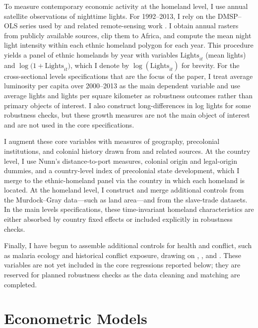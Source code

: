 \documentclass[12pt]{article}
\begin{document}
To measure contemporary economic activity at the homeland level, I use annual satellite observations of nighttime lights. For 1992--2013, I rely on the DMSP--OLS series used by \citet{henderson2012} and related remote-sensing work \citep{elvidge1997,doll2006}. I obtain annual rasters from publicly available sources, clip them to Africa, and compute the mean night light intensity within each ethnic homeland polygon for each year. This procedure yields a panel of ethnic homelands by year with variables $\text{Lights}_{it}$ (mean lights) and $\log\bigl(1+\text{Lights}_{it}\bigr)$, which I denote by $\log(\text{Lights}_{it})$ for brevity. For the cross-sectional levels specifications that are the focus of the paper, I treat average luminosity per capita over 2000--2013 as the main dependent variable and use average lights and lights per square kilometer as robustness outcomes rather than primary objects of interest. I also construct long-differences in log lights for some robustness checks, but these growth measures are not the main object of interest and are not used in the core specifications.

I augment these core variables with measures of geography, precolonial institutions, and colonial history drawn from \citet{nunn2008} and related sources. At the country level, I use Nunn's distance-to-port measures, colonial origin and legal-origin dummies, and a country-level index of precolonial state development, which I merge to the ethnic-homeland panel via the country in which each homeland is located. At the homeland level, I construct and merge additional controls from the Murdock--Gray data---such as land area---and from the slave-trade datasets. In the main levels specifications, these time-invariant homeland characteristics are either absorbed by country fixed effects or included explicitly in robustness checks.

Finally, I have begun to assemble additional controls for health and conflict, such as malaria ecology and historical conflict exposure, drawing on \citet{gallupsachs2001}, \citet{miguel2004}, and \citet{maystadtecker2014}. These variables are not yet included in the core regressions reported below; they are reserved for planned robustness checks as the data cleaning and matching are completed.

\section{Econometric Models}
\label{sec:model}
\end{document}
